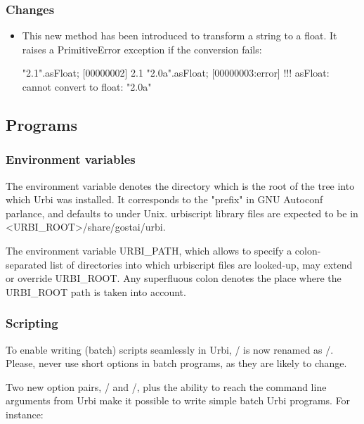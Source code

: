 \subsubsection{Changes}

\begin{itemize}
\item {}

  This new method has been introduced to transform a string to a float.  It
  raises a PrimitiveError exception if the conversion fails:

\begin{urbiscript}
"2.1".asFloat;
[00000002] 2.1
"2.0a".asFloat;
[00000003:error] !!! asFloat: cannot convert to float: "2.0a"
\end{urbiscript}
\end{itemize}

\subsection{Programs}

\subsubsection{Environment variables}

The environment variable  denotes the directory which
is the root of the tree into which Urbi was installed.  It corresponds
to the "prefix" in GNU Autoconf parlance, and defaults to
 under Unix.  urbiscript library files are expected
to be in <URBI\_ROOT>/share/gostai/urbi.

The environment variable URBI\_PATH, which allows to specify a
colon-separated list of directories into which urbiscript files are
looked-up, may extend or override URBI\_ROOT.  Any superfluous colon
denotes the place where the URBI\_ROOT path is taken into account.

\subsubsection{Scripting}

To enable writing (batch) scripts seamlessly in Urbi, 
/ is now renamed as /.
Please, never use short options in batch programs, as they are likely to
change.

Two new option pairs, / and
/, plus the ability to reach the command line
arguments from Urbi make it possible to write simple batch Urbi programs.
For instance:

